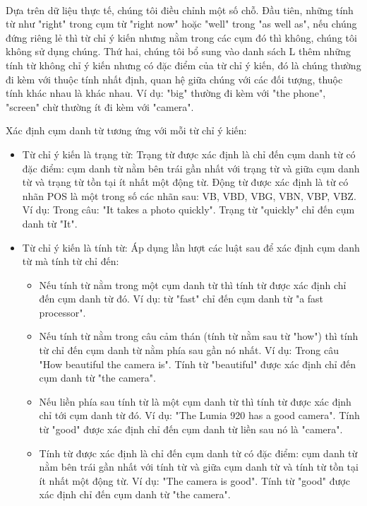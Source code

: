 \documentclass[12pt]{report}
\begin{document}
					\\ Dựa trên dữ liệu thực tế, chúng tôi điều chỉnh một số chỗ. Đầu tiên, những tính từ như "right" trong cụm từ "right now" hoặc "well" trong "as well as", nếu chúng đứng riêng lẻ thì từ chỉ ý kiến nhưng nằm trong các cụm đó thì không, chúng tôi không sử dụng chúng. Thứ hai, chúng tôi bổ sung vào danh sách L thêm những tính từ không chỉ ý kiến nhưng có đặc điểm của từ chỉ ý kiến, đó là chúng thường đi kèm với thuộc tính nhất định, quan hệ giữa chúng với các đối tượng, thuộc tính khác nhau là khác nhau. Ví dụ: "big" thường đi kèm với "the phone", "screen" chừ thường ít đi kèm với "camera".
					\par Xác định cụm danh từ tương ứng với mỗi từ chỉ ý kiến:
					\begin{itemize}
						\item{Từ chỉ ý kiến là trạng từ:
						Trạng từ được xác định là chỉ đến cụm danh từ có đặc điểm: cụm danh từ nằm bên trái gần nhất với trạng từ và giữa cụm danh từ và trạng từ tồn tại ít nhất một động từ. Động từ được xác định là từ có nhãn POS là một trong số các nhãn sau: VB, VBD, VBG, VBN, VBP, VBZ. Ví dụ: Trong câu: "It takes a photo quickly". Trạng từ "quickly" chỉ đến cụm danh từ "It".}
						\item{Từ chỉ ý kiến là tính từ: 
						Áp dụng lần lượt các luật sau để xác định cụm danh từ mà tính từ chỉ đến:
							\begin{itemize}
								\item{Nếu tính từ nằm trong một cụm danh từ thì tính từ được xác định chỉ đến cụm danh từ đó. Ví dụ: từ "fast" chỉ đến cụm danh từ "a fast processor".}
								\item{Nếu tính từ nằm trong câu cảm thán (tính từ nằm sau từ "how") thì tính từ chỉ đến cụm danh từ nằm phía sau gần nó nhất. Ví dụ: Trong câu "How beautiful the camera is". Tính từ "beautiful" được xác định chỉ đến cụm danh từ "the camera".}
								\item{Nếu liền phía sau tính từ là một cụm danh từ thì tính từ được xác định chỉ tới cụm danh từ đó. Ví dụ: "The Lumia 920 has a good camera". Tính từ "good" được xác định chỉ đến cụm danh từ liền sau nó là "camera".}
								\item{Tính từ được xác định là chỉ đến cụm danh từ có đặc điểm: cụm danh từ nằm bên trái gần nhất với tính từ và giữa cụm danh từ và tính từ tồn tại ít nhất một động từ. Ví dụ: "The camera is good". Tính từ "good" được xác định chỉ đến cụm danh từ "the camera".}
							\end{itemize}}
					\end{itemize}
\end{document}
